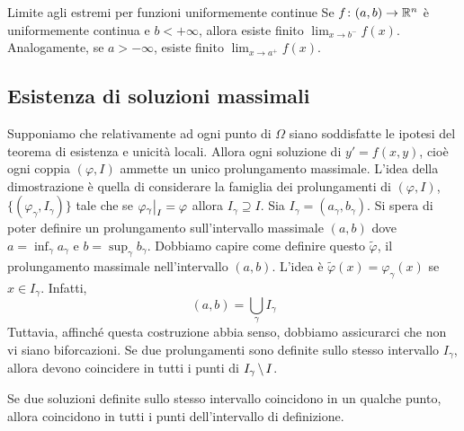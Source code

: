 \documentclass[a4paper]{article}
\begin{document}
\begin{radioactive}
\begin{snippetproposition}{Limite agli estremi per funzioni uniformemente continue}
    Se \(f\colon(a,b)\to\mathbb{R}^n\) è uniformemente continua e \(b<+\infty\),
    allora esiste finito \(\lim_{x\to b^-}f(x)\). Analogamente, se \(a>-\infty\),
    esiste finito \(\lim_{x\to a^+}f(x)\).
\end{snippetproposition}
\end{radioactive}

\subsection{Esistenza di soluzioni massimali}

\begin{radioactive}
Supponiamo che relativamente ad ogni punto di \(\Omega\)
siano soddisfatte le ipotesi del teorema di esistenza e unicità locali.
Allora ogni soluzione di \(y' = f(x,y)\),
cioè ogni coppia \((\varphi, I)\) ammette un unico prolungamento massimale.
L'idea della dimostrazione è quella di considerare la famiglia dei prolungamenti
di \((\varphi, I)\), \(\{(\varphi_\gamma, I_\gamma)\}\)
tale che se \(\restr{\varphi_\gamma}{I} = \varphi\) allora \(I_\gamma \supseteq I\).
Sia \(I_\gamma = (a_\gamma, b_\gamma)\).
Si spera di poter definire un prolungamento sull'intervallo massimale \((a,b)\)
dove \(a = \inf_\gamma a_\gamma\) e \(b = \sup_\gamma b_\gamma\).
Dobbiamo capire come definire questo \(\tilde \varphi\), il prolungamento massimale nell'intervallo \((a,b)\).
L'idea è \(\tilde \varphi(x) = \varphi_\gamma(x)\)
se \(x \in I_\gamma\). Infatti,
\[
    (a,b) = \bigcup_\gamma I_\gamma
\]
Tuttavia, affinché questa costruzione abbia senso, dobbiamo assicurarci che non vi siano biforcazioni.
Se due prolungamenti sono definite sullo stesso intervallo \(I_\gamma\), allora devono coincidere
in tutti i punti di \(I_\gamma \,\backslash\, I\).
\end{radioactive}

\begin{radioactive}
\begin{snippetlemma}{}
    Se due soluzioni definite sullo stesso intervallo coincidono in un qualche punto,
    allora coincidono in tutti i punti dell'intervallo di definizione.
\end{snippetlemma}
\end{radioactive}
\end{document}
